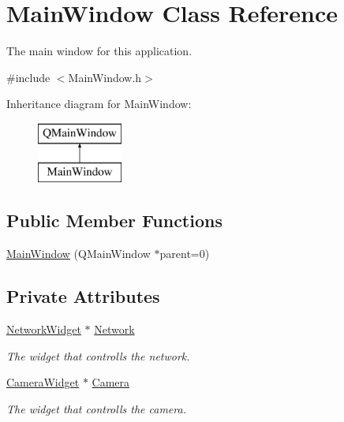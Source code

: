 \hypertarget{classMainWindow}{\section{Main\-Window Class Reference}
\label{classMainWindow}
}


The main window for this application.  




{\ttfamily \#include $<$Main\-Window.\-h$>$}

Inheritance diagram for Main\-Window\-:\begin{figure}[H]
\begin{center}
\leavevmode
\includegraphics[height=2.000000cm]{classMainWindow}
\end{center}
\end{figure}
\subsection*{Public Member Functions}
\begin{DoxyCompactItemize}
\item 
\hyperlink{classMainWindow_ab7d94977fe4f15c9850f3e4928e02672}{Main\-Window} (Q\-Main\-Window $\ast$parent=0)
\end{DoxyCompactItemize}
\subsection*{Private Attributes}
\begin{DoxyCompactItemize}
\item 
\hyperlink{classNetworkWidget}{Network\-Widget} $\ast$ \hyperlink{classMainWindow_a28553a574d726f7be2831c6d4590096b}{Network}
\begin{DoxyCompactList}\small\item\em The widget that controlls the network. \end{DoxyCompactList}\item 
\hyperlink{classCameraWidget}{Camera\-Widget} $\ast$ \hyperlink{classMainWindow_a941b44f2384c25f45dbba74c4dc3dd7d}{Camera}
\begin{DoxyCompactList}\small\item\em The widget that controlls the camera. \end{DoxyCompactList}\end{DoxyCompactItemize}


